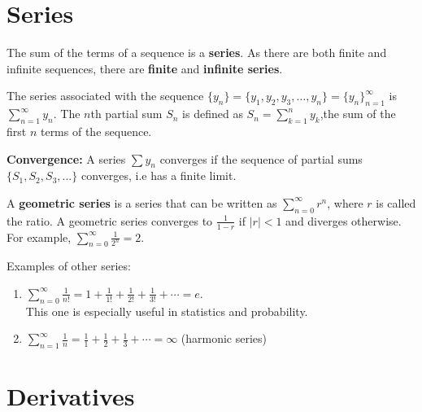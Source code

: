 \documentclass[]{book}
\theoremstyle{definition}
\theoremstyle{definition}
\theoremstyle{definition}
\theoremstyle{remark}
\begin{document}

\section{Series}\label{series}

The sum of the terms of a sequence is a \textbf{series}. As there are
both finite and infinite sequences, there are \textbf{finite} and
\textbf{infinite series}.

The series associated with the sequence
\(\{y_n\}=\{y_1, y_2, y_3, \ldots, y_n\} = \{y_n\}_{n=1}^{\infty}\) is
\(\sum_{n=1}^{\infty} y_n\). The \(n\)th partial sum \(S_n\) is defined
as \(S_n=\sum_{k=1}^n y_k\),the sum of the first \(n\) terms of the
sequence.

\textbf{Convergence:} A series \(\sum y_n\) converges if the sequence of
partial sums \(\{S_1, S_2, S_3, ...\}\) converges, i.e has a finite
limit.

A \textbf{geometric series} is a series that can be written as
\(\sum_{n=0}^{\infty} r^n\), where \(r\) is called the ratio. A
geometric series converges to \(\frac{1}{1-r}\) if \(|r|< 1\) and
diverges otherwise. For example,
\(\sum_{n=0}^{\infty} \frac{1}{2^n} = 2\).

Examples of other series:

\begin{enumerate}
        \item  $\sum_{n=0}^{\infty} \frac{1}{n!} = 1 + \frac{1}{1!} + \frac{1}{2!} + \frac{1}{3!} + \cdots = e$.\\
        This one is especially useful in statistics and probability.
        \item $\sum_{n=1}^{\infty} \frac{1}{n} = \frac{1}{1} + \frac{1}{2}  + \frac{1}{3} + \cdots = \infty$ (harmonic series)
\end{enumerate}

\section{Derivatives}\label{derivatives}
\end{document}
